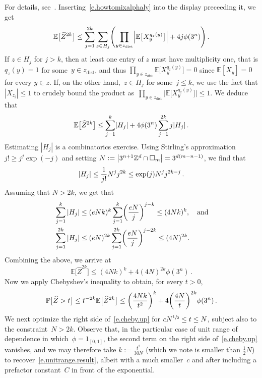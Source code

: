\documentclass[11pt]{article} %
\let\oldsquare\square %
\renewcommand{\square}{\oldsquare}
\numberwithin{equation}{section}
\theoremstyle{definition}
\let\originalleft\left
\let\originalright\right
\renewcommand{\left}{\mathopen{}\mathclose\bgroup\originalleft}
\renewcommand{\right}{\aftergroup\egroup\originalright}
\newcommand*{\Zd}{\ensuremath{\mathbb{Z}^d}}
\renewcommand*{\hat}{\widehat}
\newcommand{\cu}{\square}
\renewcommand{\P}{\mathbb{P}}
\newcommand{\E}{\mathbb{E}}
\newcommand{\indc}{1}
\begin{document}
For details, see~\cite[Appendix A]{AM}.
Inserting~\eqref{e.howtomixalphaly} into the display preceeding it, we get 
\begin{equation*} \label{}
\E \bigl[ \hat{Z}^{2k} \bigr]
\leq 
\sum_{j=1}^{2k} \sum_{z \in H_j} \left( \prod_{y \in z_{\mathrm{dist}}} \left| \E \bigl[ X_{y}^{q_z(y)} \bigr] \right| + 4 j\phi(3^n) \right) \, . 
\end{equation*}
If $z \in H_j$ for $j>k$, then at least one entry of $z$ must have multiplicity one, that is $q_z(y) = 1$ for some~$y \in z_{\mathrm{dist}}$, and thus $\prod_{y \in z_{\mathrm{dist}}}  \E \big[ X_{y}^{q_z(y)} \big]   =0$ since $\E[X_y] = 0$ for every $y \in z$. If, on the other hand,~$z \in H_j$ for some~$j\leq k$, we use the fact that $|X_{z_i}| \leq 1$ to crudely bound  the product as~$\prod_{y \in z_{\mathrm{dist}}} \big| \E \big[ X_{y}^{q_z(y)} \big] \big|  \leq 1$.
We deduce that 
\begin{equation*} \label{}
\E \bigl[ \hat{Z}^{2k} \bigr]
\leq 
\sum_{j=1}^{k} \left| H_j \right| + 4 \phi(3^n) \sum_{j=1}^{2k} j \left| H_j \right|
\,.
\end{equation*}
Estimating $|H_j|$ is a combinatorics exercise. Using Stirling's approximation $j!\geq j^j \exp(-j)$ and setting $N:=\left| 3^{n+1}\Zd\cap \cu_m\right| = 3^{d(m-n-1)}$, we find that
\begin{equation*} \label{}
\left| H_j \right| 
\leq \frac1{j!} N^jj^{2k}
\leq \exp(j) N^j j^{2k-j}
\,.
\end{equation*}
Assuming that $N>2k$, we get that 
\begin{equation*} \label{}
\begin{aligned}
&
\sum_{j=1}^k |H_j| 
\leq 
(e N k)^k \sum_{j=1}^k \left(  \frac{e N }{j}   \right)^{j-k} 
\leq (4 Nk)^k,
\quad\mbox{and} 
\\ & 
\sum_{j=1}^{2k} |H_j| 
\leq 
(e N)^{2k} \sum_{j=1}^{2k} \left(  \frac{e N }{j}   \right)^{j-2k}
\leq (4 N)^{2k}. 
\end{aligned} 
\end{equation*}
Combining the above, we arrive at
\begin{equation*} \label{}
\E \bigl[ \hat{Z}^{2k} \bigr]
\leq 
(4Nk)^k 
+ 
4 (4N)^{2k} \phi(3^n)
\,.
\end{equation*}
Now we apply Chebyshev's inequality to obtain, for every $t >0$, 
\begin{equation} 
\label{e.cheby.up}
\P \bigl[  \hat{Z} > t \bigr]
\leq 
t^{-2k} \E \bigl[ \hat{Z}^{2k} \bigr] 
\leq 
\left(\frac{4Nk}{t^2}\right)^k 
+ 
4 \left( \frac{4N}{t} \right)^{2k} \phi(3^n)
\,.
\end{equation}
We next optimize the right side of~\eqref{e.cheby.up} for $cN^{\sfrac12} \leq t \leq N$, subject also to the constraint~$N>2k$. 
Observe that, in the particular case of unit range of dependence in which~$\phi=\indc_{[0,1]}$, the second term on the right side of~\eqref{e.cheby.up} vanishes, and we may therefore take $k:= \frac{t^2}{30N}$ (which we note is smaller than $\frac12N$) to recover~\eqref{e.unitrange.result},  albeit with a much smaller~$c$ and after including a prefactor constant~$C$ in front of the exponential. 
\end{document}
